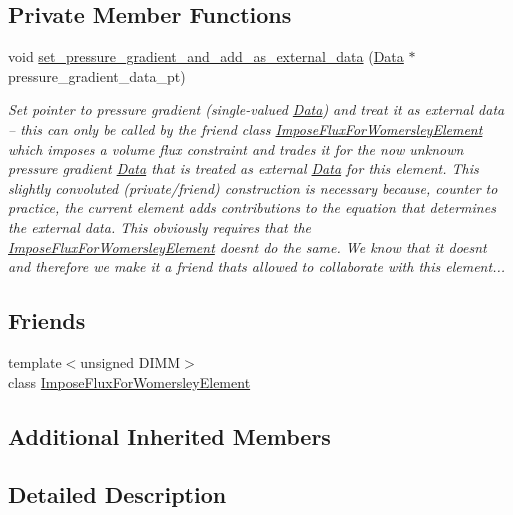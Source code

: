 \subsection*{Private Member Functions}
\begin{DoxyCompactItemize}
\item 
void \hyperlink{classoomph_1_1WomersleyEquations_ae4c9206bebee065874acb318d2abf20d}{set\+\_\+pressure\+\_\+gradient\+\_\+and\+\_\+add\+\_\+as\+\_\+external\+\_\+data} (\hyperlink{classoomph_1_1Data}{Data} $\ast$pressure\+\_\+gradient\+\_\+data\+\_\+pt)
\begin{DoxyCompactList}\small\item\em Set pointer to pressure gradient (single-\/valued \hyperlink{classoomph_1_1Data}{Data}) and treat it as external data -- this can only be called by the friend class \hyperlink{classoomph_1_1ImposeFluxForWomersleyElement}{Impose\+Flux\+For\+Womersley\+Element} which imposes a volume flux constraint and trades it for the now unknown pressure gradient \hyperlink{classoomph_1_1Data}{Data} that is treated as external \hyperlink{classoomph_1_1Data}{Data} for this element. This slightly convoluted (private/friend) construction is necessary because, counter to practice, the current element adds contributions to the equation that determines the external data. This obviously requires that the \hyperlink{classoomph_1_1ImposeFluxForWomersleyElement}{Impose\+Flux\+For\+Womersley\+Element} doesn\textquotesingle{}t do the same. We know that it doesn\textquotesingle{}t and therefore we make it a friend that\textquotesingle{}s allowed to collaborate with this element... \end{DoxyCompactList}\end{DoxyCompactItemize}
\subsection*{Friends}
\begin{DoxyCompactItemize}
\item 
{\footnotesize template$<$unsigned D\+I\+MM$>$ }\\class \hyperlink{classoomph_1_1WomersleyEquations_a216440116a86af2614ff792554f8f745}{Impose\+Flux\+For\+Womersley\+Element}
\end{DoxyCompactItemize}
\subsection*{Additional Inherited Members}


\subsection{Detailed Description}

